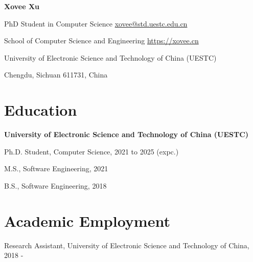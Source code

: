 \documentclass{article}
\begin{document}
\begin{center}
    \vspace*{5pt}
    \Huge{
    \textbf{Xovee Xu}}
\end{center}
\vspace{15pt}



\setlength{\parskip}{1pt}

\noindent PhD Student in Computer Science \hfill \href{mailto:xovee@std.uestc.edu.cn}{xovee@std.uestc.edu.cn}

\noindent School of Computer Science and Engineering \hfill \url{https://xovee.cn}

\noindent University of Electronic Science and Technology of China (UESTC)

\noindent Chengdu, Sichuan 611731, China


\setlength{\parskip}{3pt}

\section*{Education}
\indent 

\textbf{University of Electronic Science and Technology of China (UESTC)}

\hspace{2em}Ph.D. Student, Computer Science, 2021 to 2025 (expc.)

\hspace{2em}M.S., Software Engineering, 2021

\hspace{2em}B.S., Software Engineering, 2018




\section*{Academic Employment}
\indent

Research Assistant, University of Electronic Science and Technology of China, 2018 -
\end{document}
